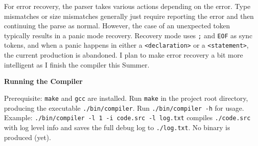 \documentclass[letterpaper, 12pt, titlepage]{article}
\begin{document}
	\par For error recovery, the parser takes various actions depending on the
	error.
	Type mismatches or size mismatches generally just require reporting the error
	and then continuing the parse as normal.
	However, the case of an unexpected token typically results in a panic mode
	recovery.
	Recovery mode uses \texttt{;} and \texttt{EOF} as sync tokens, and when a
	panic happens in either a \texttt{<declaration>} or a \texttt{<statement>},
	the current production is abandoned.
	I plan to make error recovery a bit more intelligent as I finish the compiler
	this Summer.

	\par \textbf{Running the Compiler}
	\par Prerequisite: \texttt{make} and \texttt{gcc} are installed.
	Run \texttt{make} in the project root directory, producing the executable
	\texttt{./bin/compiler}.
	Run \texttt{./bin/compiler -h} for usage.
	Example: \texttt{./bin/compiler -l 1 -i code.src -l log.txt} compiles
	\texttt{./code.src} with log level info and saves the full debug log to
	\texttt{./log.txt}.
	No binary is produced (yet).
\end{document}
